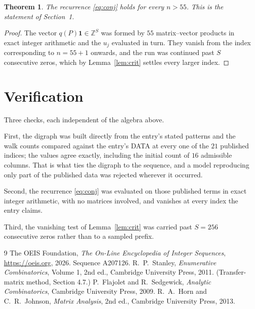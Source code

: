 \documentclass[11pt,a4paper]{article}
\theoremstyle{plain}
\newtheorem{theorem}{Theorem}
\theoremstyle{definition}
\begin{document}
\begin{theorem}
The recurrence \eqref{eq:conj} holds for every $n>55$. This is the statement of
Section~1.
\end{theorem}

\begin{proof}
The vector $q(P)\mathbf{1}\in\mathbb{Z}^{S}$ was formed by $55$ matrix--vector
products in exact integer arithmetic and the $u_j$ evaluated in turn. They vanish from the
index corresponding to $n=55+1$ onwards, and the run was continued past $S$ consecutive
zeros, which by Lemma~\ref{lem:crit} settles every larger index.
\end{proof}

\section{Verification}

Three checks, each independent of the algebra above.

First, the digraph was built directly from the entry's stated patterns and the walk counts
compared against the entry's DATA at every one of the $21$ published indices; the
values agree exactly, including the initial count of $16$ admissible columns. That is
what ties the digraph to the sequence, and a model reproducing only part of the published
data was rejected wherever it occurred.

Second, the recurrence \eqref{eq:conj} was evaluated on those published terms in exact
integer arithmetic, with no matrices involved, and vanishes at every index the entry claims.

Third, the vanishing test of Lemma~\ref{lem:crit} was carried past $S=256$ consecutive
zeros rather than to a sampled prefix.

\begin{thebibliography}{9}
 The OEIS Foundation, \emph{The On-Line Encyclopedia of Integer
Sequences}, \url{https://oeis.org}, 2026. Sequence A207126.
 R.~P.~Stanley, \emph{Enumerative Combinatorics}, Volume 1, 2nd ed.,
Cambridge University Press, 2011. (Transfer-matrix method, Section 4.7.)
 P.~Flajolet and R.~Sedgewick, \emph{Analytic Combinatorics}, Cambridge
University Press, 2009.
 R.~A.~Horn and C.~R.~Johnson, \emph{Matrix Analysis}, 2nd ed., Cambridge
University Press, 2013.
\end{thebibliography}
\end{document}
